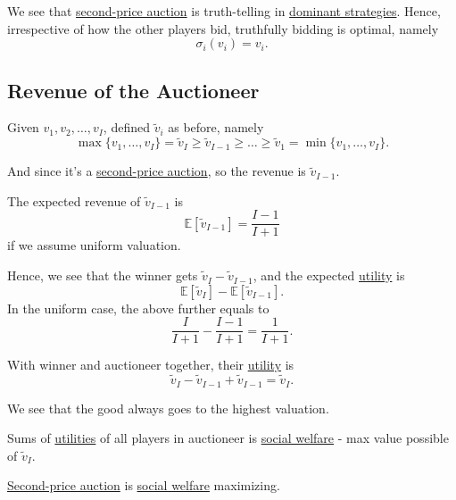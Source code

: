\begin{remark}
	We see that \hyperref[eg:second-price-auction]{second-price auction} is truth-telling in \hyperref[def:dominant-strategy]{dominant strategies}. Hence, irrespective of how the other players bid, truthfully bidding is optimal, namely
	\[
		\sigma_{i}(v_{i}) = v_{i}.
	\]
\end{remark}

\subsection{Revenue of the Auctioneer}
Given \(v_1, v_2, \dots , v_I\), defined \(\widetilde{v}_i\) as before, namely
\[
	\max\{v_1, \dots , v_I\} = \widetilde{v}_{I}\geq \widetilde{v}_{I-1}\geq \dots \geq \widetilde{v}_1 = \min\{v_1, \dots , v_I\}.
\]

And since it's a \hyperref[eg:second-price-auction]{second-price auction}, so the revenue is \(\widetilde{v}_{I - 1}\).

\begin{note}
	The expected revenue of \(\widetilde{v}_{I - 1}\) is
	\[
		\mathbb{E}\left[\widetilde{v}_{I-1} \right] = \frac{I-1}{I+1}
	\]
	if we assume uniform valuation.
\end{note}

Hence, we see that the winner gets \(\widetilde{v}_{I} - \widetilde{v}_{I-1}\), and the expected \hyperref[def:reward]{utility}  is
\[
	\mathbb{E}\left[\widetilde{v}_{I} \right] - \mathbb{E}\left[\widetilde{v}_{I - 1} \right].
\]
In the uniform case, the above further equals to
\[
	\frac{I}{I+1} - \frac{I - 1}{I + 1} = \frac{1}{I+1}.
\]

With winner and auctioneer together, their \hyperref[def:reward]{utility}  is
\[
	\widetilde{v}_{I} - \widetilde{v}_{I - 1}+\widetilde{v}_{I - 1} = \widetilde{v}_{I}.
\]

\begin{remark}
	We see that the good always goes to the highest valuation.
\end{remark}

Sums of \hyperref[def:reward]{utilities} of all players in auctioneer is \hyperref[def:social-welfare]{social welfare} - max value possible of \(\widetilde{v}_{I}\).

\begin{remark}
	\hyperref[eg:second-price-auction]{Second-price auction} is \hyperref[def:social-welfare]{social welfare} maximizing.
\end{remark}

